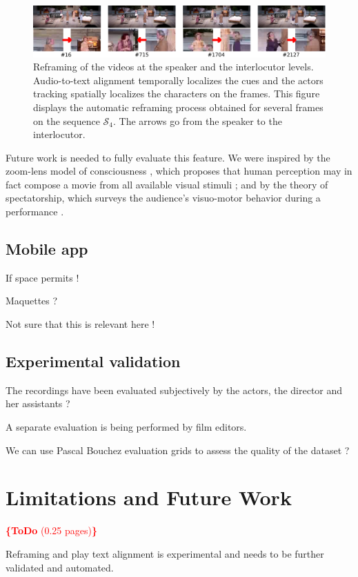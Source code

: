\documentclass[conference]{IEEEtran}
\newcommand{\todo}[1]{\noindent\textcolor{red}{{\bf \{ToDo} #1{\bf \}}}}
\begin{document}
\begin{figure}[tp]
\centering
\includegraphics[width=\textwidth]{speakers2}
\caption{Reframing of the videos at the speaker and the interlocutor levels. Audio-to-text alignment temporally localizes the cues and the actors tracking spatially localizes the characters on the frames. 
This figure displays the automatic reframing process obtained for several frames on the sequence $\mathcal{S}_4$. The arrows go from the speaker to the interlocutor.}
\label{fig_speaker}
\end{figure}


Future work is needed to fully evaluate this feature. We were inspired by the zoom-lens model of consciousness \cite{Eriksen86}, 
which proposes  that human perception  may in fact compose a movie from all available visual  stimuli  ; and by the theory 
of spectatorship, which surveys the audience's visuo-motor behavior  during a performance \cite{Bennett97}.   





\subsection{Mobile app} If space permits !

Maquettes ?

Not sure that this is relevant here !


\subsection{Experimental validation}
The recordings have been evaluated subjectively by the actors, the director and her assistants ?

A separate evaluation is being performed by film editors.

We can use Pascal Bouchez evaluation grids to assess the quality of the dataset ?


\section{Limitations and Future  Work}
\todo{(0.25 pages)}

Reframing and play text alignment is experimental and needs to be further validated and automated.
\end{document}
